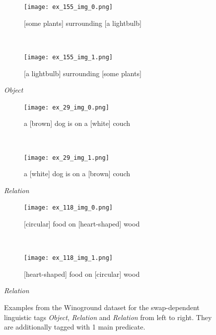 \begin{figure}[ht]
\centering
    \begin{minipage}[t]{.30\textwidth}
        \begin{subfigure}[t]{\textwidth}
        \centering
        \texttt{[image: ex\_155\_img\_0.png]}
        \caption{[some plants] surrounding [a lightbulb]}
        \end{subfigure}\\
        \begin{subfigure}[t]{\textwidth}
        \centering
        \texttt{[image: ex\_155\_img\_1.png]}
        \caption{[a lightbulb] surrounding [some plants]}
        \end{subfigure}%
        \caption*{\textit{Object}}
    \end{minipage}
    \hfill
    \begin{minipage}[t]{.30\textwidth}
        \begin{subfigure}[t]{\textwidth}
        \centering
        \texttt{[image: ex\_29\_img\_0.png]}
        \caption{a [brown] dog is on a [white] couch}
        \end{subfigure}\\
        \vspace{10pt}
        \begin{subfigure}[t]{\textwidth}
        \centering
        \texttt{[image: ex\_29\_img\_1.png]}
        \caption{a [white] dog is on a [brown] couch}
        \end{subfigure}%
        \vspace{10pt}
        \caption*{\textit{Relation}}
    \end{minipage}
    \hfill
    \begin{minipage}[t]{.30\textwidth}
        \begin{subfigure}[t]{\textwidth}
        \centering
        \texttt{[image: ex\_118\_img\_0.png]}
        \caption{[circular] food on [heart-shaped] wood}
        \end{subfigure}\\
        \begin{subfigure}[t]{\textwidth}
        \centering
        \texttt{[image: ex\_118\_img\_1.png]}
        \caption{[heart-shaped] food on [circular] wood}
        \end{subfigure}%
        \caption*{\textit{Relation}}
    \end{minipage}%
    \caption{Examples from the Winoground dataset for the swap-dependent linguistic tags \textit{Object}, \textit{Relation} and \textit{Relation} from left to right. They are additionally tagged with 1 main predicate.}
    \label{fig:winoground-examples}
\end{figure}

